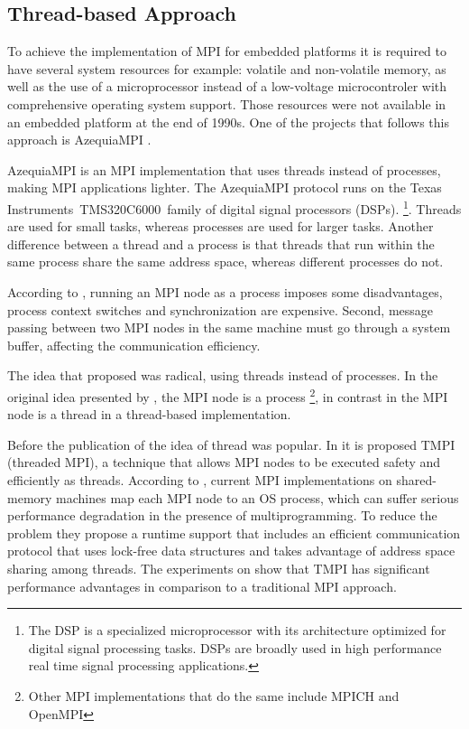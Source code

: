 
\subsection{Thread-based Approach}

To achieve the implementation of MPI for embedded platforms it is required to
have several system resources for example: volatile and non-volatile memory, as
well as the use of a microprocessor instead of a low-voltage microcontroler
with comprehensive operating system support. Those resources were not available
in an embedded platform at the end of 1990s.  One of the projects that follows
this approach is AzequiaMPI \cite{Gallego}.

AzequiaMPI is an MPI implementation that uses threads instead of processes,
making MPI applications lighter. The AzequiaMPI protocol runs on the Texas
Instruments\textregistered\ TMS320C6000\textregistered\ family of digital
signal processors (DSPs). \footnote{The DSP is a specialized microprocessor
with its architecture optimized for digital signal processing tasks. DSPs are
broadly used in high performance real time signal processing applications.}.
Threads are used for small tasks, whereas processes are used for larger tasks.
Another difference between a thread and a process is that threads that run
within the same process share the same address space, whereas different
processes do not.

According to \cite{Gallego}, running an MPI node as a process imposes some
disadvantages, process context switches and synchronization are expensive.
Second, message passing between two MPI nodes in the same machine must go
through a system buffer, affecting  the communication efficiency. 

The idea that \cite{Gallego} proposed was radical, using threads instead of
processes. In the original idea presented by \cite{Salim}, the MPI node  is a
process \footnote{Other MPI implementations that do the same include MPICH and
OpenMPI}, in contrast in \cite{Gallego} the MPI node is a thread in a
thread-based implementation.

Before the publication of \cite{Gallego} the idea of thread was popular.  In
\cite{Tang} it is proposed TMPI (threaded MPI), a technique that  allows MPI
nodes to be executed safety and efficiently as threads. According to
\cite{Tang}, current MPI implementations on shared-memory machines map each MPI
node to an OS process, which can suffer serious performance degradation in the
presence of multiprogramming. To reduce the problem they propose a runtime
support that includes an efficient communication protocol that uses lock-free
data structures and takes advantage of address space sharing among threads. The
experiments on \cite{Tang} show that TMPI has significant performance
advantages in comparison to a traditional MPI approach.

